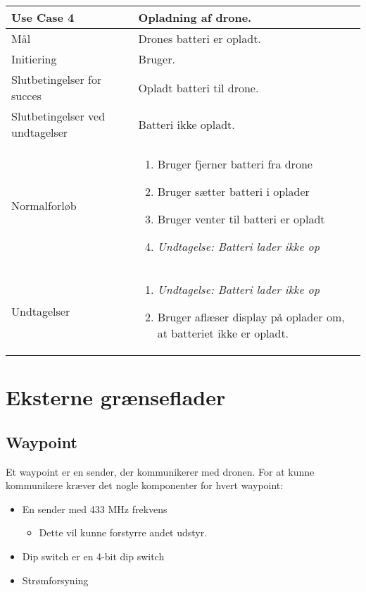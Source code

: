 \documentclass[Main]{subfiles}
\begin{document}
\begin{longtable}{|p{}|p{}|}
\hline
Use Case 4 	& 
Opladning af drone. \\ \hline

Mål 		& 
Drones batteri er opladt. \\ \hline

Initiering	& 
Bruger. \\ \hline

Slutbetingelser for succes & 
Opladt batteri til drone.  \\ \hline

Slutbetingelser ved undtagelser & 
Batteri ikke opladt. \\ \hline

Normalforløb &	\vspace{-8mm}
	\begin{enumerate}
	\item Bruger fjerner batteri fra drone
	\item Bruger sætter batteri i oplader
	\item Bruger venter til batteri er opladt
	\item[]	\textit{Undtagelse: Batteri lader ikke op}
	\end{enumerate} \\ \hline

Undtagelser & \vspace{-8mm}
	\begin{enumerate}
	\item[] \textit{Undtagelse: Batteri lader ikke op}
	\item Bruger aflæser display på oplader om, at batteriet ikke er opladt.
	\end{enumerate} \\

\hline
\end{longtable}


\newpage	
\section{Eksterne grænseflader}

\subsection{Waypoint}
Et waypoint er en sender, der kommunikerer med dronen.
For at kunne kommunikere kræver det nogle komponenter for hvert waypoint:

	\begin{itemize}
	\item En sender med 433 MHz frekvens
	
		\begin{itemize}
		\item Dette vil kunne forstyrre andet udstyr.
		\end{itemize}
	
	\item Dip switch er en 4-bit dip switch
	
	\item Strømforsyning 
	\end{itemize}
	
\end{document}
